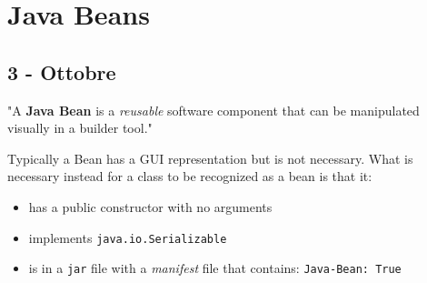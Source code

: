 \chapter{Java Beans}
\section{3 - Ottobre}
"A \textbf{Java Bean} is a \textit{reusable} software component that can be
manipulated visually in a builder tool."

Typically a Bean has a GUI representation but is not necessary.
What is necessary instead for a class to be recognized as a bean is that it:
\begin{itemize}
    \item has a public constructor with no arguments
    \item implements \lstinline{java.io.Serializable}
    \item is in a \lstinline{jar} file with a \textit{manifest} file that contains:
    \lstinline{Java-Bean: True}
\end{itemize}


